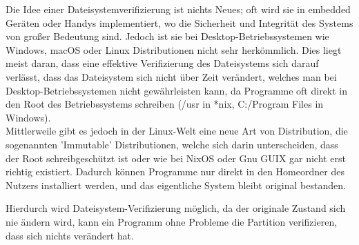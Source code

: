 Die Idee einer Dateisystemverifizierung ist nichts Neues; oft wird sie in embedded Geräten oder Handys implementiert, wo die Sicherheit und Integrität des Systems von großer Bedeutung sind.
Jedoch ist sie bei Desktop-Betriebssystemen wie Windows, macOS oder Linux Distributionen nicht sehr herkömmlich. Dies liegt meist daran, dass eine effektive Verifizierung des Dateisystems sich darauf verlässt, dass das Dateisystem sich nicht über Zeit verändert, welches man bei Desktop-Betriebssystemen nicht gewährleisten kann, da Programme oft direkt in den Root des Betriebssystems schreiben (/usr in *nix, C:/Program Files in Windows).
\\
Mittlerweile gibt es jedoch in der Linux-Welt eine neue Art von Distribution, die sogenannten 'Immutable' Distributionen, welche sich darin unterscheiden, dass der Root schreibgeschützt ist oder wie bei NixOS oder Gnu GUIX gar nicht erst richtig existiert. Dadurch können Programme nur direkt in den Homeordner des Nutzers installiert werden, und das eigentliche System bleibt original bestanden.

Hierdurch wird Dateisystem-Verifizierung möglich, da der originale Zustand sich nie ändern wird, kann ein Programm ohne Probleme die Partition verifizieren, dass sich nichts verändert hat.






